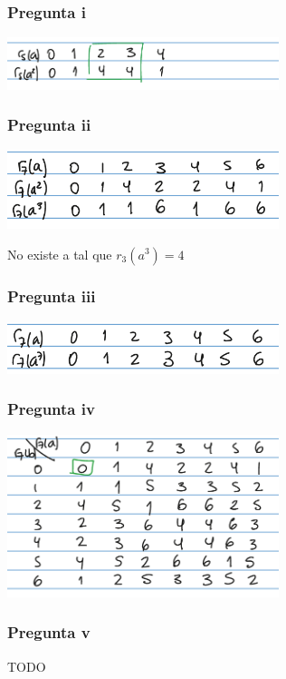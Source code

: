 \subsubsection{Pregunta i}
\includegraphics[width=300px]{4.11.1}

\subsubsection{Pregunta ii}
\includegraphics[width=300px]{4.11.2}

No existe a tal que $ r_3(a^3) = 4$

\subsubsection{Pregunta iii}
\includegraphics[width=300px]{4.11.3}

\subsubsection{Pregunta iv}
\includegraphics[width=300px]{4.11.4}

\subsubsection{Pregunta v}
TODO

